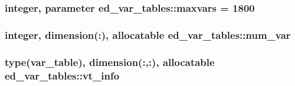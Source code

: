 \subsubsection[{maxvars}]{\setlength{\rightskip}{0pt plus 5cm}integer, parameter ed\+\_\+var\+\_\+tables\+::maxvars = 1800}\label{namespaceed__var__tables_a932cd6738531dd3348d40636bd8a20ae}
\hypertarget{namespaceed__var__tables_ae879757190201e461d3bc09131321a64}{}
\subsubsection[{num\+\_\+var}]{\setlength{\rightskip}{0pt plus 5cm}integer, dimension(\+:), allocatable ed\+\_\+var\+\_\+tables\+::num\+\_\+var}\label{namespaceed__var__tables_ae879757190201e461d3bc09131321a64}
\hypertarget{namespaceed__var__tables_a949fa9110a835bd59e16bd0a5e153498}{}
\subsubsection[{vt\+\_\+info}]{\setlength{\rightskip}{0pt plus 5cm}type({\bf var\+\_\+table}), dimension(\+:,\+:), allocatable ed\+\_\+var\+\_\+tables\+::vt\+\_\+info}\label{namespaceed__var__tables_a949fa9110a835bd59e16bd0a5e153498}
